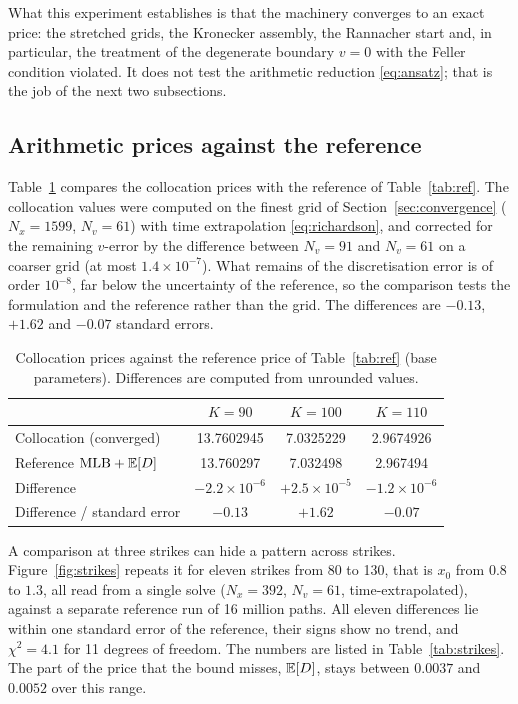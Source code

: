 What this experiment establishes is that the machinery converges to an exact price: the stretched grids,
the Kronecker assembly, the Rannacher start and, in particular, the treatment of the degenerate boundary
$v=0$ with the Feller condition violated. It does not test the arithmetic reduction \eqref{eq:ansatz}; that
is the job of the next two subsections.

\subsection{Arithmetic prices against the reference}\label{sec:arith}

Table~\ref{tab:arith} compares the collocation prices with the reference of Table~\ref{tab:ref}. The
collocation values were computed on the finest grid of Section~\ref{sec:convergence} ($N_x=1599$,
$N_v=61$) with time extrapolation \eqref{eq:richardson}, and corrected for the remaining $v$-error by the
difference between $N_v=91$ and $N_v=61$ on a coarser grid (at most $1.4\times10^{-7}$). What remains of the
discretisation error is of order $10^{-8}$, far below the uncertainty of the reference, so the comparison
tests the formulation and the reference rather than the grid. The differences are $-0.13$, $+1.62$ and
$-0.07$ standard errors.

\begin{table}[t]
\centering
\caption{Collocation prices against the reference price of Table~\ref{tab:ref} (base parameters). Differences are computed from unrounded values.}
\label{tab:arith}
\small
\begin{tabular}{lccc}
\toprule
& $K=90$ & $K=100$ & $K=110$\\
\midrule
Collocation (converged) & 13.7602945 & 7.0325229 & 2.9674926\\
Reference $\mathrm{MLB}+\mathbb{E}[D]$ & 13.760297 & 7.032498 & 2.967494\\
Difference & $-2.2\times10^{-6}$ & $+2.5\times10^{-5}$ & $-1.2\times10^{-6}$\\
Difference / standard error & $-0.13$ & $+1.62$ & $-0.07$\\
\bottomrule
\end{tabular}
\end{table}

A comparison at three strikes can hide a pattern across strikes. Figure~\ref{fig:strikes} repeats it for
eleven strikes from 80 to 130, that is $x_0$ from $0.8$ to $1.3$, all read from a single solve ($N_x=392$,
$N_v=61$, time-extrapolated), against a separate reference run of 16 million paths. All eleven differences
lie within one standard error of the reference, their signs show no trend, and
$\chi^2=4.1$ for 11 degrees of freedom. The numbers are listed in Table~\ref{tab:strikes}. The part of the
price that the bound misses, $\mathbb{E}[D]$, stays between $0.0037$ and $0.0052$ over this range.

